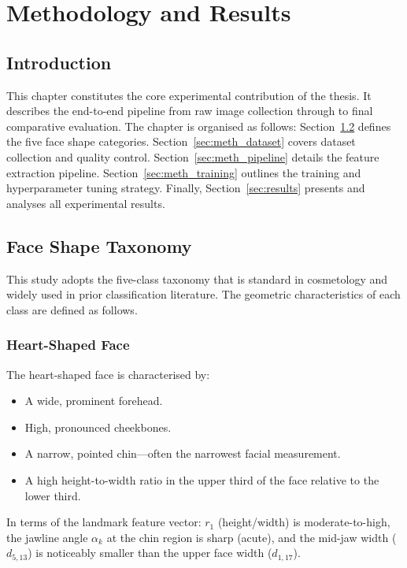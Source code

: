 \chapter{Methodology and Results}
\label{chap:methodology}

\section{Introduction}
\label{sec:meth_intro}

This chapter constitutes the core experimental contribution of the thesis. It describes the end-to-end pipeline from raw image collection through to final comparative evaluation. The chapter is organised as follows: Section~\ref{sec:meth_faceshapes} defines the five face shape categories. Section~\ref{sec:meth_dataset} covers dataset collection and quality control. Section~\ref{sec:meth_pipeline} details the feature extraction pipeline. Section~\ref{sec:meth_training} outlines the training and hyperparameter tuning strategy. Finally, Section~\ref{sec:results} presents and analyses all experimental results.

\section{Face Shape Taxonomy}
\label{sec:meth_faceshapes}

This study adopts the five-class taxonomy that is standard in cosmetology and widely used in prior classification literature. The geometric characteristics of each class are defined as follows.

\subsection{Heart-Shaped Face}
The heart-shaped face is characterised by:
\begin{itemize}
    \item A wide, prominent forehead.
    \item High, pronounced cheekbones.
    \item A narrow, pointed chin—often the narrowest facial measurement.
    \item A high height-to-width ratio in the upper third of the face relative to the lower third.
\end{itemize}
In terms of the landmark feature vector: $r_1$ (height/width) is moderate-to-high, the jawline angle $\alpha_k$ at the chin region is sharp (acute), and the mid-jaw width ($d_{5,13}$) is noticeably smaller than the upper face width ($d_{1,17}$).


